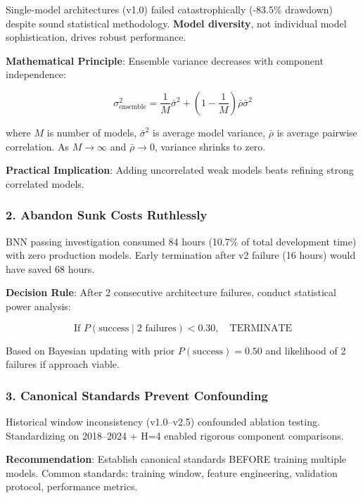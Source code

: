 Single-model architectures (v1.0) failed catastrophically (-83.5\% drawdown) despite sound statistical methodology. \textbf{Model diversity}, not individual model sophistication, drives robust performance.

\textbf{Mathematical Principle}: Ensemble variance decreases with component independence:

\begin{equation}
\sigma^2_{\text{ensemble}} = \frac{1}{M} \bar{\sigma}^2 + \left(1 - \frac{1}{M}\right) \bar{\rho} \bar{\sigma}^2
\label{eq:ensemble-variance-decomposition}
\end{equation}

where $M$ is number of models, $\bar{\sigma}^2$ is average model variance, $\bar{\rho}$ is average pairwise correlation. As $M \to \infty$ and $\bar{\rho} \to 0$, variance shrinks to zero.

\textbf{Practical Implication}: Adding uncorrelated weak models beats refining strong correlated models.

\subsubsection{2. Abandon Sunk Costs Ruthlessly}

BNN passing investigation consumed 84 hours (10.7\% of total development time) with zero production models. Early termination after v2 failure (16 hours) would have saved 68 hours.

\textbf{Decision Rule}: After 2 consecutive architecture failures, conduct statistical power analysis:

\begin{equation}
\text{If } P(\text{success} \mid \text{2 failures}) < 0.30, \quad \text{TERMINATE}
\end{equation}

Based on Bayesian updating with prior $P(\text{success}) = 0.50$ and likelihood of 2 failures if approach viable.

\subsubsection{3. Canonical Standards Prevent Confounding}

Historical window inconsistency (v1.0--v2.5) confounded ablation testing. Standardizing on 2018--2024 + H=4 enabled rigorous component comparisons.

\textbf{Recommendation}: Establish canonical standards BEFORE training multiple models. Common standards: training window, feature engineering, validation protocol, performance metrics.

